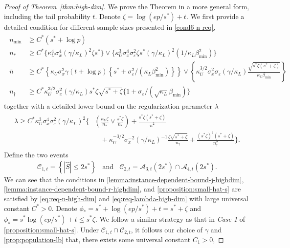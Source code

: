 \documentclass[10pt]{article}
\numberwithin{equation}{section}
\begin{document}
\begin{proof}[Proof of Theorem~\ref{thm:high-dim}]
We prove the Theorem in a more general form, including the tail probability $t$. Denote $\zeta = \log(ep/s^*) + t$. We first provide a detailed condition for different sample sizes presented in \cref{cond6-n-req},
\begin{align}
\label{eq:req-n-high-dim}
\begin{split}
    n_{\min} &\ge C^* (s^* + \log p) \\
    n_* &\ge C^* \Big\{\kappa_U^4\sigma_x^4 (\gamma/\kappa_L)^2 \zeta s^* \Big\} \lor \Big\{\kappa_U^3 \sigma_x^4 \sigma_\varepsilon^2 \zeta s^* (\gamma/\kappa_L)^2 (1/\kappa_L\beta_{\min}^2)\Big\} \\
    \bar{n} &\ge C^* \left\{\kappa_U\sigma_x^2 \gamma (t + \log p) \left\{ s^* +  \sigma_\varepsilon^2 / (\kappa_L \beta_{\min}^2)\right\} \right\}\lor \left\{\kappa_U^{3/2}\sigma_x^2\sigma_\varepsilon (\gamma/\kappa_L) \frac{\sqrt{s^* \zeta (s^* + \zeta)}}{\kappa_L \beta_{\min}}\right\} \\
    n_\dagger &\ge C^* \kappa_U^{3/2} \sigma_x^2 (\gamma/\kappa_L) s^* \zeta \sqrt{s^* + \zeta} \{1 + \sigma_\varepsilon/(\sqrt{\kappa_L} \beta_{\min})\}
\end{split}
\end{align} together with a detailed lower bound on the regularization parameter $\lambda$
\begin{align}
\label{eq:req-lambda-high-dim}
\begin{split}
    \lambda \ge C^*\kappa_U^3 \sigma_x^4 \sigma_\varepsilon^2 (\gamma/\kappa_L)^2 \Bigg\{ &\left(\frac{\kappa_U \zeta}{n_*} \lor \frac{s^* \zeta}{n_*}\right) + \frac{s^* \zeta(s^* + \zeta)}{\bar{n}^2} \\ 
    &~~~~ + \kappa_U^{-3/2} \sigma_x^{-2} (\gamma/\kappa_L)^{-1} \frac{\zeta\sqrt{s^* + \zeta}}{n_\dagger} + \frac{(s^*\zeta)^2(s^* + \zeta)}{n_\dagger^2} \Bigg\}.
\end{split}
\end{align}
Define the two events
\begin{align*}
    \mathcal{C}_{1,t} = \left\{|\hat{S}| \le 2s^*\right\} ~~~~\text{and}~~~~ \mathcal{C}_{2,t} = \mathcal{A}_{3,t}(2s^*) \cap \mathcal{A}_{4,t}(2s^*).
\end{align*} We can see that the conditions in \cref{lemma:instance-dependent-bound-j-highdim}, \cref{lemma:instance-dependent-bound-r-highdim},  and \cref{proposition:small-hat-s} are satisfied by \eqref{eq:req-n-high-dim} and \eqref{eq:req-lambda-high-dim} with large universal constant $C^*>0$. Denote $\phi_* = s^* + \log(ep/s^*) + t = s^* + \zeta$ and $\phi_s = s^* \log(ep/s^*) + t \le s^* \zeta$. We follow a similar strategy as that in \emph{Case 1} of \cref{proposition:small-hat-s}. Under $\mathcal{C}_{1,t} \cap \mathcal{C}_{2,t}$, it follows our choice of $\gamma$ and \cref{prop:population-lb} that, there exists some universal constant $C_1>0$,

\end{proof}
\end{document}

